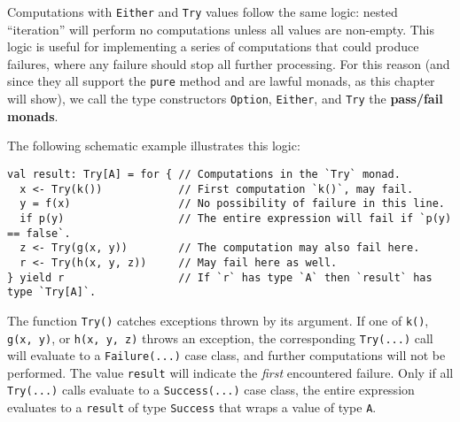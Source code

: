Computations with \lstinline!Either! and \lstinline!Try! values
follow the same logic: nested \textsf{``}iteration\textsf{''} will perform no computations
unless all values are non-empty. This logic is useful for implementing
a series of computations that could produce failures, where any failure
should stop all further processing. For this reason (and since they
all support the \lstinline!pure! method and are lawful monads, as
this chapter will show), we call the type constructors \lstinline!Option!,
\lstinline!Either!, and \lstinline!Try! the \textbf{pass/fail monads}. 

The following schematic example illustrates this logic:
\begin{lstlisting}
val result: Try[A] = for { // Computations in the `Try` monad.
  x <- Try(k())            // First computation `k()`, may fail.
  y = f(x)                 // No possibility of failure in this line.
  if p(y)                  // The entire expression will fail if `p(y) == false`.
  z <- Try(g(x, y))        // The computation may also fail here.
  r <- Try(h(x, y, z))     // May fail here as well.
} yield r                  // If `r` has type `A` then `result` has type `Try[A]`.
\end{lstlisting}
The function \lstinline!Try()! catches exceptions thrown by its argument.
If one of \lstinline!k()!, \lstinline!g(x, y)!, or \lstinline!h(x, y, z)!
throws an exception, the corresponding \lstinline!Try(...)! call
will evaluate to a \lstinline!Failure(...)! case class, and further
computations will not be performed. The value \lstinline!result!
will indicate the \emph{first} encountered failure. Only if all \lstinline!Try(...)!
calls evaluate to a \lstinline!Success(...)! case class, the entire
expression evaluates to a \lstinline!result! of type \lstinline!Success!
that wraps a value of type \lstinline!A!.

